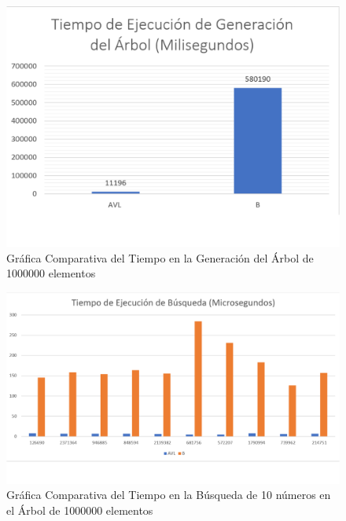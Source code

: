 \documentclass[acmsmall]{acmart}
\begin{document}
\clearpage
\begin{figure}[ht]
  \centering
  \caption{Gráfica Comparativa del Tiempo en la Generación del Árbol de 1000000 elementos}

  \includegraphics[angle=0,scale=0.6]{1000000.1 elem.png}
  
\end{figure}
\begin{figure}[ht]
  \centering
  \caption{Gráfica Comparativa del Tiempo en la Búsqueda de 10 números en el Árbol de 1000000 elementos}

  \includegraphics[angle=0,scale=0.53]{1000000.2 elem.png}
  
\end{figure}
\end{document}
